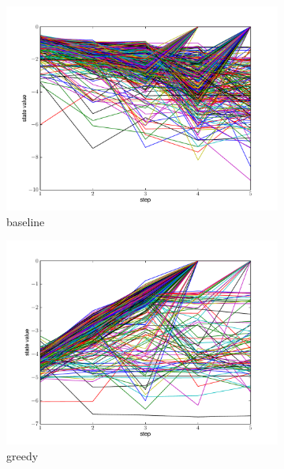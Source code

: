 \begin{figure}
  \centering
  \begin{subfigure}[b]{0.9\linewidth}
    \includegraphics[width=\textwidth]{figures/state_value_baseline.pdf}
    \caption{baseline}
    \label{fig:value_baseline}
  \end{subfigure}
  \begin{subfigure}[b]{0.9\linewidth}
    \includegraphics[width=\textwidth]{figures/state_value_greedy.pdf}
    \caption{greedy}
    \label{fig:value_greedy}
  \end{subfigure}
  \begin{subfigure}[b]{0.9\linewidth}

\end{subfigure}
\end{figure}
